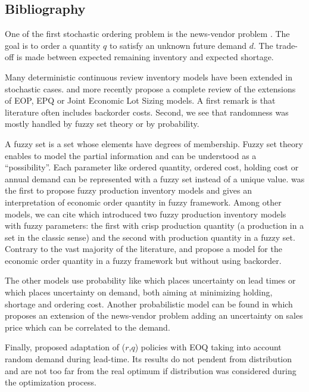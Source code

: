 \subsection{Bibliography}


One of the first stochastic ordering problem is the news-vendor problem \cite{Edgeworth88, Arrow1951}.
The goal is to order a quantity $q$ to satisfy an unknown future demand $d$.
The trade-off is made between expected remaining inventory and expected shortage.


Many deterministic continuous review inventory models have been extended in stochastic cases.
\cite{Candace1995} and more recently \cite{Ziukov2015} propose a complete review of the extensions of EOP, EPQ or Joint Economic Lot Sizing models.
A first remark is that literature often includes backorder costs.
Second, we see that randomness was mostly handled by fuzzy set theory or by probability.


\medskip


A fuzzy set is a set whose elements have degrees of membership.
Fuzzy set theory enables to model the partial information and can be understood as a ``possibility''.
Each parameter like ordered quantity, ordered cost, holding cost or annual demand can be represented with a fuzzy set instead of a unique value.
\cite{Park1987} was the first to propose fuzzy production inventory models and gives an interpretation of economic order quantity in fuzzy framework.
Among other models, we can cite \cite{Hsieh2002} which introduced two fuzzy production inventory models with fuzzy parameters: the first with crisp production quantity (\ie a production in a set in the classic sense) and the second with production quantity in a fuzzy set.
Contrary to the vast majority of the literature, \cite{Lee1999} and \cite{Wang2007} propose a model for the economic order quantity in a fuzzy framework but without using backorder.



The other models use probability like \cite{Friedman1984} which places uncertainty on lead times or \cite{Eynan2007} which places uncertainty on demand, both aiming at minimizing holding, shortage and ordering cost.
Another probabilistic model can be found in \cite{Sana2011} which proposes an extension of the news-vendor problem adding an uncertainty on sales price which can be correlated to the demand.


Finally, \cite{Gallego1998} proposed adaptation of ($r$,$q$) policies with EOQ taking into account random demand during lead-time.
Its results do not pendent from distribution and are not too far from the real optimum if distribution was considered during the optimization process.


